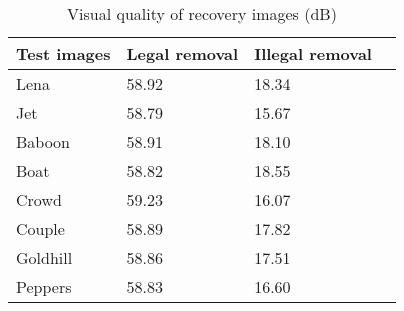 \documentclass[12pt,a4paper]{article}
\begin{document}
\begin{table}[!ht]
\caption{Visual quality of recovery images (dB)\label{tab0}}
\begin{threeparttable}
\begin{tabular*}{\columnwidth}{@{\extracolsep\fill}llll@{\extracolsep\fill}}
\toprule
Test images & Legal removal & Illegal removal\\
\midrule
Lena & 58.92 & 18.34 \\
Jet & 58.79 & 15.67 \\
Baboon &58.91	&18.10\\
Boat	&58.82	&18.55\\
Crowd	&59.23	&16.07\\
Couple	&58.89	&17.82\\
Goldhill	&58.86	&17.51\\
Peppers	&58.83	&16.60\\
\bottomrule
\end{tabular*}
\end{threeparttable}
\end{table}
\end{document}
